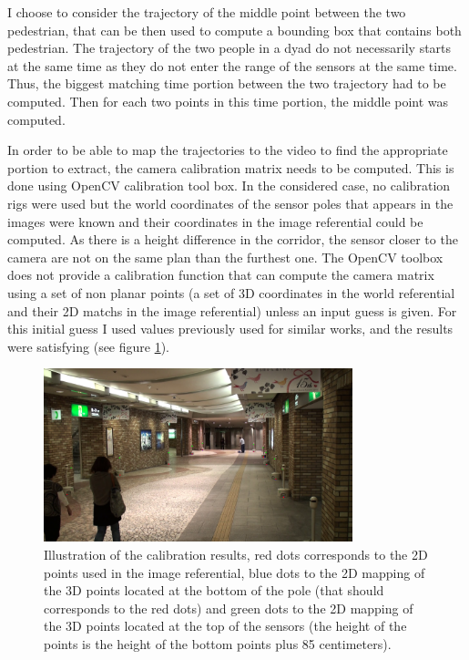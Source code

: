 \documentclass[12pt,a4paper,twoside]{article}
\begin{document}
I choose to consider the trajectory of the middle point between the two pedestrian, that can be then used to compute a bounding box that contains both pedestrian. The trajectory of the two people in a dyad do not necessarily starts at the same time as they do not enter the range of the sensors at the same time. Thus, the biggest matching time portion between the two trajectory had to be computed. Then for each two points in this time portion, the middle point was computed.

In order to be able to map the trajectories to the video to find the appropriate portion to extract, the camera calibration matrix needs to be computed. This is done using OpenCV calibration tool box. In the considered case, no calibration rigs were used but the world coordinates of the sensor poles that appears in the images were known and their coordinates in the image referential could be computed. As there is a height difference in the corridor, the sensor closer to the camera are not on the same plan than the furthest one. The OpenCV toolbox does not provide a calibration function that can compute the camera matrix using a set of non planar points (a set of 3D coordinates in the world referential and their 2D matchs in the image referential) unless an input guess is given. For this initial guess I used values previously used for similar works, and the results were satisfying (see figure \ref{fig:calibration}).

\begin{figure}
    \centering
        \includegraphics[width=0.8\textwidth]{images/calibration}
    \caption{Illustration of the calibration results, red dots corresponds to the 2D points used in the image referential, blue dots to the 2D mapping of the 3D points located at the bottom of the pole (that should corresponds to the red dots) and green dots to the 2D mapping of the 3D points located at the top of the sensors (the height of the points is the height of the bottom points plus 85 centimeters). }
    \label{fig:calibration}
\end{figure}
\end{document}
